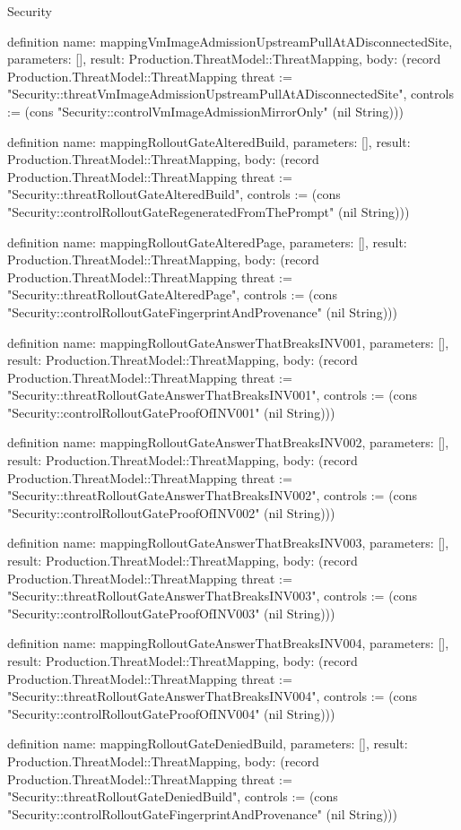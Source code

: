\begin{lexlean}{Security}
\begin{semanticmodule}
definition{
  name: mappingVmImageAdmissionUpstreamPullAtADisconnectedSite,
  parameters: [],
  result: Production.ThreatModel::ThreatMapping,
  body: (record Production.ThreatModel::ThreatMapping {threat := "Security::threatVmImageAdmissionUpstreamPullAtADisconnectedSite", controls := (cons "Security::controlVmImageAdmissionMirrorOnly" (nil String))})
}

definition{
  name: mappingRolloutGateAlteredBuild,
  parameters: [],
  result: Production.ThreatModel::ThreatMapping,
  body: (record Production.ThreatModel::ThreatMapping {threat := "Security::threatRolloutGateAlteredBuild", controls := (cons "Security::controlRolloutGateRegeneratedFromThePrompt" (nil String))})
}

definition{
  name: mappingRolloutGateAlteredPage,
  parameters: [],
  result: Production.ThreatModel::ThreatMapping,
  body: (record Production.ThreatModel::ThreatMapping {threat := "Security::threatRolloutGateAlteredPage", controls := (cons "Security::controlRolloutGateFingerprintAndProvenance" (nil String))})
}

definition{
  name: mappingRolloutGateAnswerThatBreaksINV001,
  parameters: [],
  result: Production.ThreatModel::ThreatMapping,
  body: (record Production.ThreatModel::ThreatMapping {threat := "Security::threatRolloutGateAnswerThatBreaksINV001", controls := (cons "Security::controlRolloutGateProofOfINV001" (nil String))})
}

definition{
  name: mappingRolloutGateAnswerThatBreaksINV002,
  parameters: [],
  result: Production.ThreatModel::ThreatMapping,
  body: (record Production.ThreatModel::ThreatMapping {threat := "Security::threatRolloutGateAnswerThatBreaksINV002", controls := (cons "Security::controlRolloutGateProofOfINV002" (nil String))})
}

definition{
  name: mappingRolloutGateAnswerThatBreaksINV003,
  parameters: [],
  result: Production.ThreatModel::ThreatMapping,
  body: (record Production.ThreatModel::ThreatMapping {threat := "Security::threatRolloutGateAnswerThatBreaksINV003", controls := (cons "Security::controlRolloutGateProofOfINV003" (nil String))})
}

definition{
  name: mappingRolloutGateAnswerThatBreaksINV004,
  parameters: [],
  result: Production.ThreatModel::ThreatMapping,
  body: (record Production.ThreatModel::ThreatMapping {threat := "Security::threatRolloutGateAnswerThatBreaksINV004", controls := (cons "Security::controlRolloutGateProofOfINV004" (nil String))})
}

definition{
  name: mappingRolloutGateDeniedBuild,
  parameters: [],
  result: Production.ThreatModel::ThreatMapping,
  body: (record Production.ThreatModel::ThreatMapping {threat := "Security::threatRolloutGateDeniedBuild", controls := (cons "Security::controlRolloutGateFingerprintAndProvenance" (nil String))})
}


\end{semanticmodule}
\end{lexlean}
